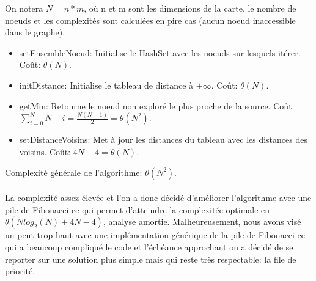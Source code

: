 \documentclass[12pt,a4paper]{article}
\begin{document}
On notera $N = n*m$, où n et m sont les dimensions de la carte, le nombre de noeuds et les complexités sont calculées en pire cas (aucun noeud inaccessible dans le graphe).
\begin{itemize}
	\item setEnsembleNoeud: Initialise le HashSet avec les noeuds sur lesquels itérer. Coût: $\theta(N)$.
	\item initDistance: Initialise le tableau de distance à $+\infty$. Coût: $\theta(N)$.
	\item getMin: Retourne le noeud non exploré le plus proche de la source. Coût: $\sum\limits_{i=0}^{N}{N-i} = \frac{N(N-1)}{2} = \theta(N^2)$.
	\item setDistanceVoisins: Met à jour les distances du tableau avec les distances des voisins. Coût: $4N-4 = \theta(N)$.\\
\end{itemize}
Complexité générale de l'algorithme: $\theta(N^2)$.\\\\
La complexité assez élevée et l'on a donc décidé d'améliorer l'algorithme avec une pile de Fibonacci ce qui permet d'atteindre la complexitée optimale en $\theta(Nlog_2(N)+4N-4)$, analyse amortie. Malheureusement, nous avons visé un peut trop haut avec une implémentation générique de la pile de Fibonacci ce qui a beaucoup compliqué le code et l'échéance approchant on a décidé de se reporter sur une solution plus simple mais qui reste très respectable: la file de priorité.\\
\end{document}
